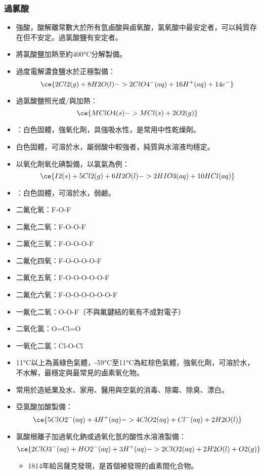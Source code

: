 \documentclass[a4paper,12pt]{report}
\begin{document}
\subsubsection{過氯酸}
\begin{itemize}
\item 強酸，酸解離常數大於所有氫鹵酸與鹵氧酸，氯氧酸中最安定者，可以純質存在但不安定。過氯酸鹽有安定者。
\item 將氯酸鹽加熱至約400°C分解製備。
\item 過度電解濃食鹽水於正極製備：
\[\ce{2Cl2(g) + 8H2O(l) -> 2ClO4^-(aq) + 16H^+(aq) + 14e^-}\]
\item 過氯酸鹽照光或/與加熱：
\[\ce{MClO4(s) -> MCl(s) + 2O2(g)}\]
\item {}：白色固體，強氧化劑，具強吸水性，是常用中性乾燥劑。
\eit
{}
\bit
\item 白色固體，可溶於水，屬弱酸中較強者，純質與水溶液均穩定。
\item 以氧化劑氧化碘製備，以氯氣為例：
\[\ce{I2(s) + 5Cl2(g) + 6H2O(l) -> 2HIO3(aq) + 10HCl(aq)}\]
\item {}：白色固體，可溶於水，弱鹼。
\eit
{}
\bit
\item 二氟化氧：F-O-F
\item 二氟化二氧：F-O-O-F
\item 二氟化三氧：F-O-O-O-F
\item 二氟化四氧：F-O-O-O-O-F
\item 二氟化五氧：F-O-O-O-O-O-F
\item 二氟化六氧：F-O-O-O-O-O-O-F
\item 一氟化二氧：O-O-F（不與氟鍵結的氧有不成對電子）
\item 二氧化氯：O=Cl=O
\item 一氧化二氯：Cl-O-Cl
\eit
{}
\bit
\item 11°C以上為黃綠色氣體，-59°C至11°C為紅棕色氣體，強氧化劑，可溶於水，不水解，最穩定與最常見的鹵素氧化物。
\item 常用於造紙業及水、家用、醫用與空氣的消毒、除霉、除臭、漂白。
\item 亞氯酸加酸製備：
\[\ce{5ClO2^-(aq) + 4H^+(aq) -> 4ClO2(aq) + Cl^-(aq) + 2H2O(l)}\]
\item 氯酸根離子加過氧化鈉或過氧化氫的酸性水溶液製備：
\[\ce{2ClO3^-(aq) + HO2^-(aq) + 3H^+(aq) -> 2ClO2(aq) + 2H2O(l) + O2(g)}\]
\eit
{}
\begin{itemize}
\item 1814年給呂薩克發現，是首個被發現的鹵素間化合物。

\end{itemize}
\end{itemize}
\end{document}
